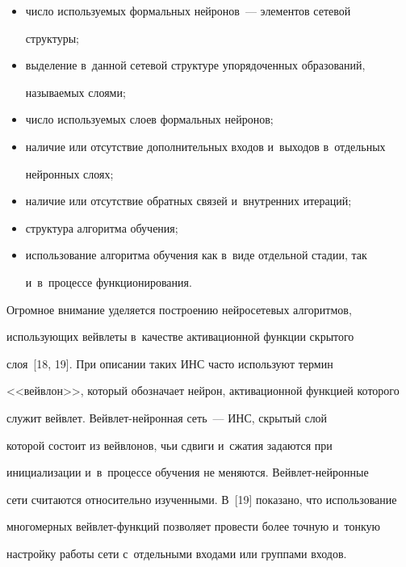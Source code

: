   \begin{itemize}


\item число используемых формальных нейронов~--- элементов сетевой 


структуры;


\item выделение в~данной сетевой структуре упорядоченных образований, 


на\-зы\-ва\-емых слоями;


\item число использу\-емых слоев формальных нейронов;


\item наличие или отсутствие дополнительных входов и~выходов в~отдельных 


нейронных слоях;


\item наличие или отсутствие обратных связей и~внутренних итераций;


\item структура алгоритма обуче\-ния;


\item использование алгоритма обучения как в~виде отдельной стадии, так 


и~в~процессе функционирования.


\end{itemize}





  Огромное внимание уделяется построению нейросетевых алгоритмов, 


использующих вейвлеты в~качестве активационной функции скрытого 


слоя~[18, 19]. При описании таких ИНС часто используют термин 


<<вейвлон>>, который обозначает нейрон, активационной функцией которого 


служит вейвлет. Вейв\-лет-ней\-рон\-ная сеть~--- ИНС, скрытый слой 


которой состоит из вейвлонов, чьи сдвиги и~сжатия задаются при 


инициализации и~в~процессе обучения не меняются. Вейв\-лет-ней\-рон\-ные 


сети считаются относительно изученными. В~[19] показано, что использование 


многомерных вейв\-лет-функ\-ций позволяет провести более точную и~тонкую 


настройку работы сети с~отдельными входами или группами входов.


